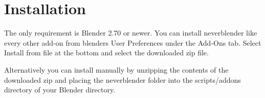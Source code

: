 \section{Installation}
The only requirement is Blender 2.70 or newer. You can install neverblender
like every other add-on from blenders User Preferences under the Add-Ons tab.
Select Install from file at the bottom and select the downloaded zip file.

Alternatively you can install manually by unzipping the contents of the
downloaded zip and placing the neverblender folder into the scripts/addons
directory of your Blender directory.
